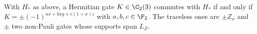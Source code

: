 With $H_*$ as above, a Hermitian gate $K\in\C_2(3)$ commutes with $H_*$ if and only if $K=\pm(-1)^{ax+bxy+c(1+x)z}$ with $a,b,c\in\F_2$. The traceless ones are $\pm Z_x$ and $\pm$ two non-Pauli gates whose supports span $L_Z$.
